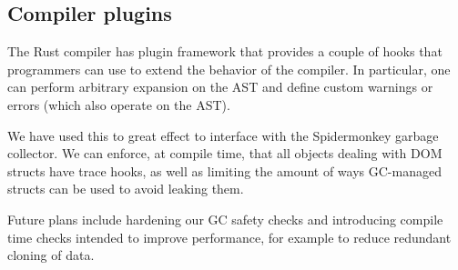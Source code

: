 \subsection{Compiler plugins}

The Rust compiler has plugin framework that provides a couple of hooks that programmers can use to extend the behavior of the compiler. In particular, one can perform arbitrary expansion on the AST and define custom warnings or errors (which also operate on the AST).

We have used this to great effect to interface with the Spidermonkey garbage collector. We can enforce, at compile time, that all objects dealing with DOM structs have trace hooks, as well as limiting the amount of ways GC-managed structs can be used to avoid leaking them.

Future plans include hardening our GC safety checks and introducing compile time checks intended to improve performance, for example to reduce redundant cloning of data.
